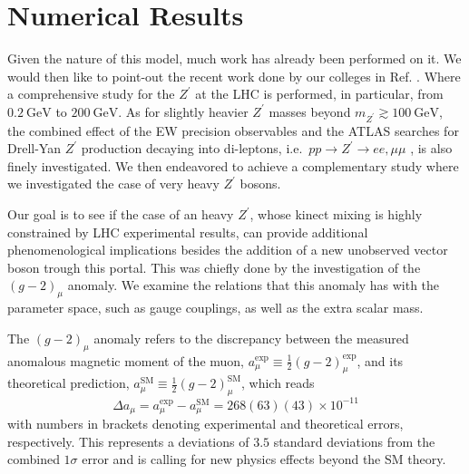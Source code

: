 \documentclass[10pt]{book}
\newcommand{\ro}[1]{\textrm{#1}}
\renewcommand{\(}{\left(}
\renewcommand{\)}{\right)}
\renewcommand{\[}{\left[}
\renewcommand{\]}{\right]}
\begin{document}
\section{Numerical Results}

Given the nature of this model, much work has already been performed on it. We would then like to point-out the recent work done by our colleges in Ref. \cite{Deppisch:2019ldi}. Where a comprehensive study for the $Z^\prime$ at the LHC is performed, in particular, from $0.2 \ \mathrm{GeV}$ to $200 \ \mathrm{GeV}$. As for slightly heavier $Z^\prime$ masses beyond $m_{Z^\prime} \gtrsim 100~\mathrm{GeV}$, the combined effect of the EW precision observables and the ATLAS searches for Drell-Yan $Z^\prime$ production decaying into di-leptons, i.e.~$pp \to Z^\prime \to ee,\mu \mu$ \cite{Aaboud:2017buh}, is also finely investigated. We then endeavored to achieve a complementary study where we investigated the case of very heavy $Z^\prime$ bosons. 

Our goal is to see if the case of an heavy $Z^\prime$, whose kinect mixing is highly constrained by LHC experimental results, can provide additional phenomenological implications besides the addition of a new unobserved vector boson trough this portal. This was chiefly done by the investigation of the $\left(g-2\right)_\mu$ anomaly. We examine the relations that this anomaly has with the parameter space, such as gauge couplings, as well as the extra scalar mass. 


The $\left( g-2 \right)_\mu$ anomaly refers to the discrepancy between the measured anomalous magnetic moment of the muon, $a_\mu^{\mathrm{\text{exp}}} \equiv \tfrac{1}{2} \left( g-2 \right)^{\mathrm{\text{exp}}}_\mu$, and its theoretical prediction, $a_\mu^{\mathrm{SM}} \equiv \tfrac{1}{2} \left(g-2\right)^{\mathrm{SM}}_\mu$, which reads \cite{Tanabashi:2018oca}
%
\begin{equation}
	\label{g-2}
	\Delta a_\mu = a_\mu^{\ro{exp}} - a_\mu^{\ro{SM}} = 268(63)(43) \times 10^{-11}
\end{equation}
%
with numbers in brackets denoting experimental and theoretical errors, respectively. This represents a deviations of $3.5$ standard deviations from the combined $1 \sigma$ error and is calling for new physics effects beyond the SM theory. 
\end{document}
